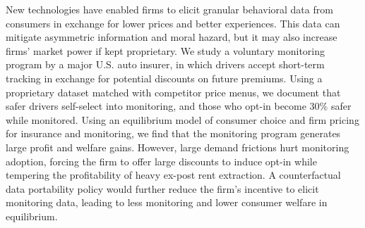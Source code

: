 New technologies have enabled firms to elicit granular behavioral data from consumers in exchange for lower prices and better experiences. This data can mitigate asymmetric information and moral hazard, but it may also increase firms' market power if kept proprietary. We study a voluntary monitoring program by a major U.S. auto insurer, in which drivers accept short-term tracking in exchange for potential discounts on future premiums. Using a proprietary dataset matched with competitor price menus, we document that safer drivers self-select into monitoring, and those who opt-in become 30\% safer while monitored. Using an equilibrium model of consumer choice and firm pricing for insurance and monitoring, we find that the monitoring program generates large profit and welfare gains. However, large demand frictions hurt monitoring adoption, forcing the firm to offer large discounts to induce opt-in while tempering the profitability of heavy ex-post rent extraction.
A counterfactual data portability policy would further reduce the firm's incentive to elicit monitoring data, leading to less monitoring and lower consumer welfare in equilibrium.